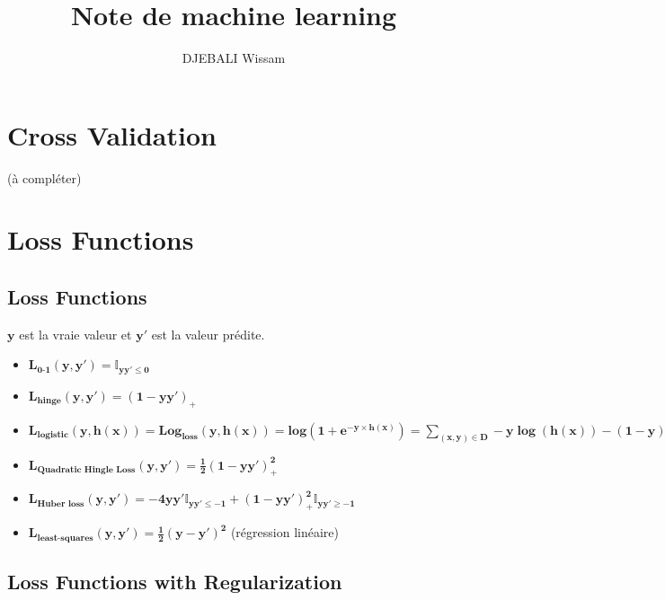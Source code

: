 \documentclass[french]{article}
\title{Note de machine learning}
\author{DJEBALI Wissam}
\begin{document}
	
    \maketitle
	
	\section{Cross Validation}
	(à compléter)
	
    \section{Loss Functions}
    \subsection{Loss Functions}
    $\bm{y}$ est la vraie valeur et $\bm{y'}$ est la valeur prédite.\\
    \begin{itemize}[label=\textbullet, font=\LARGE \color{red}]
        \item $\bm{L_{\textbf{0-1}}(y,y')=\mathbb{I}_{yy'\leq 0}}$
        \item $\bm{L_{\textbf{hinge}}(y,y')=(1-yy')_{+}}$
        \item $\bm{L_{\textbf{logistic}}(y,h(x))=Log_{\textbf{loss}}(y,h(x))=log(1+e^{-y\times h(x)})=\sum_{(x,y)\in D}-y\log(h(x))-(1-y)\log(1-h(x))}$
        \item $\bm{L_{\textbf{Quadratic Hingle Loss}}(y,y')=\frac{1}{2}(1-yy')^{2}_{+}}$
        \item $\bm{L_{\textbf{Huber loss}}(y,y') = -4yy'\mathbb{I}_{yy'\le -1} + (1-yy')^{2}_{+}\mathbb{I}_{yy'\geq-1}}$
        \item $\bm{L_{\textbf{least-squares}}(y,y')=\frac{1}{2}(y-y')^{2}}$ (régression linéaire)
    \end{itemize}
    
    \subsection{Loss Functions with Regularization}
\end{document}
